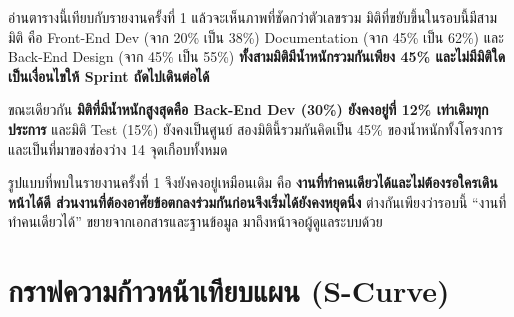 \vspace{0.8em}
\noindent อ่านตารางนี้เทียบกับรายงานครั้งที่ 1 แล้วจะเห็นภาพที่ชัดกว่าตัวเลขรวม มิติที่ขยับขึ้นในรอบนี้มีสามมิติ คือ Front-End Dev (จาก 20\% เป็น 38\%) Documentation (จาก 45\% เป็น 62\%) และ Back-End Design (จาก 45\% เป็น 55\%) \textbf{ทั้งสามมิติมีน้ำหนักรวมกันเพียง 45\% และไม่มีมิติใดเป็นเงื่อนไขให้ Sprint ถัดไปเดินต่อได้}

ขณะเดียวกัน \textbf{มิติที่มีน้ำหนักสูงสุดคือ Back-End Dev (30\%) ยังคงอยู่ที่ 12\% เท่าเดิมทุกประการ} และมิติ Test (15\%) ยังคงเป็นศูนย์ สองมิตินี้รวมกันคิดเป็น 45\% ของน้ำหนักทั้งโครงการ และเป็นที่มาของช่องว่าง 14 จุดเกือบทั้งหมด

รูปแบบที่พบในรายงานครั้งที่ 1 จึงยังคงอยู่เหมือนเดิม คือ \textbf{งานที่ทำคนเดียวได้และไม่ต้องรอใครเดินหน้าได้ดี ส่วนงานที่ต้องอาศัยข้อตกลงร่วมกันก่อนจึงเริ่มได้ยังคงหยุดนิ่ง} ต่างกันเพียงว่ารอบนี้ ``งานที่ทำคนเดียวได้'' ขยายจากเอกสารและฐานข้อมูล มาถึงหน้าจอผู้ดูแลระบบด้วย

\clearpage
\section{กราฟความก้าวหน้าเทียบแผน (S-Curve)}

